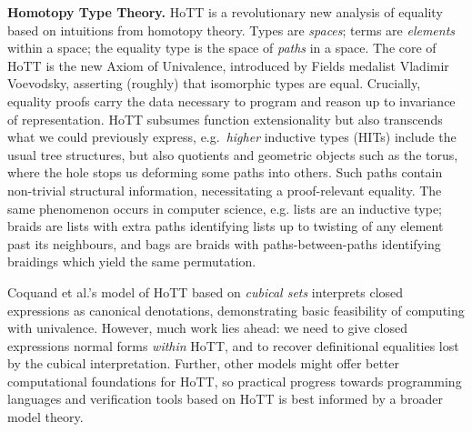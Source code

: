 \documentclass[a4paper,11pt]{article}
\begin{document}



{\bf Homotopy Type Theory.} HoTT is a revolutionary new analysis of
equality based on intuitions from homotopy theory. Types are
\emph{spaces}; terms are \emph{elements} within a space; the equality
type is the space of \emph{paths} in a space. The core of HoTT is the
new Axiom of Univalence, introduced by Fields medalist Vladimir
Voevodsky, asserting (roughly) that isomorphic types are
equal. Crucially, equality proofs carry the data necessary to program
and reason up to invariance of representation. HoTT subsumes function
extensionality but also transcends what we could previously express,
e.g.\ \emph{higher} inductive types (HITs) include the usual tree
structures, but also quotients \cite{alti:mpc04} and geometric objects such as the
torus, where the hole stops us deforming some paths into others. Such
paths contain non-trivial structural information, necessitating a
proof-relevant equality. The same phenomenon occurs in computer
science, e.g. lists are an inductive type; braids are lists with extra
paths identifying lists up to twisting of any element past its
neighbours, and bags are braids with paths-between-paths identifying
braidings which yield the same permutation.

Coquand et al.'s model of HoTT based on \emph{cubical sets} interprets closed expressions
as canonical denotations, demonstrating basic feasibility of computing
with univalence. However, much work lies ahead: we need to give
closed expressions normal forms \emph{within} HoTT, and to recover
definitional equalities lost by the cubical interpretation. Further, other models might
offer better computational foundations for HoTT, so practical progress
towards programming languages and verification tools based on HoTT
is best informed by a broader model theory.



\end{document}
